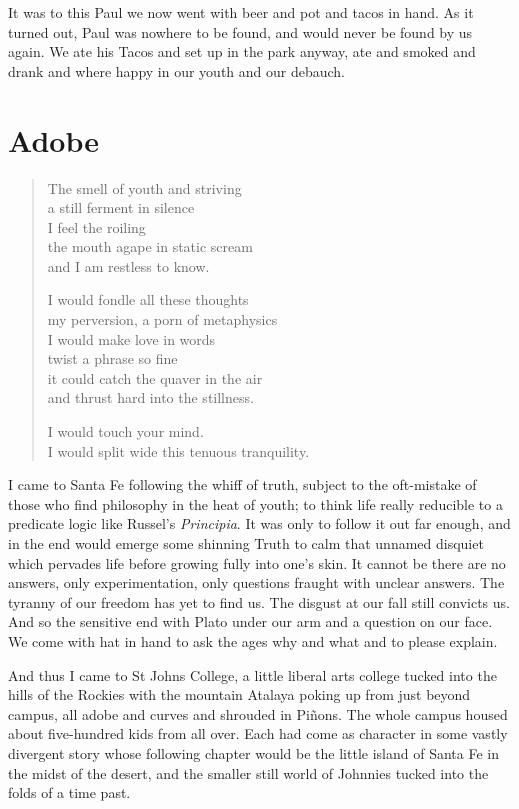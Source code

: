 \documentclass[ebook, 10pt, openright, onecolumn]{memoir}
\newenvironment{poetry}
{
  \begin{quote}
    \begin{itshape}
      \small
    }
    {
    \end{itshape}
  \end{quote}
}
\begin{document}
It was to this Paul we now went with beer and pot and tacos in hand.  As it
turned out, Paul was nowhere to be found, and would never be found by us again.
We ate his Tacos and set up in the park anyway, ate and smoked and drank and
where happy in our youth and our debauch.

\chapter{Adobe}
\label{cha:adobe}

\begin{poetry}
  The smell of youth and striving\\
  a still ferment in silence\\
  I feel the roiling\\
  the mouth agape in static scream\\
  and I am restless to know.

  
  I would fondle all these thoughts\\
  my perversion, a porn of metaphysics\\ 
  I would make love in words\\
  twist a phrase so fine\\
  it could catch the quaver in the air\\
  and thrust hard into the stillness.


  I would touch your mind.\\
  I would split wide this tenuous tranquility.\\
\end{poetry}

I came to Santa Fe following the whiff of truth, subject to the oft-mistake of
those who find philosophy in the heat of youth; to think life really reducible
to a predicate logic like Russel's \textit{Principia}. It was only to follow it
out far enough, and in the end would emerge some shinning Truth to calm that
unnamed disquiet which pervades life before growing fully into one's skin.  It
cannot be there are no answers, only experimentation, only questions fraught
with unclear answers.  The tyranny of our freedom has yet to find us.  The
disgust at our fall still convicts us.  And so the sensitive end with Plato
under our arm and a question on our face.  We come with hat in hand to ask the
ages why and what and to please explain.

And thus I came to St Johns College, a little liberal arts college tucked into
the hills of the Rockies with the mountain Atalaya poking up from just beyond
campus, all adobe and curves and shrouded in Piñons.  The whole campus housed
about five-hundred kids from all over.  Each had come as character in some
vastly divergent story whose following chapter would be the little island of
Santa Fe in the midst of the desert, and the smaller still world of Johnnies
tucked into the folds of a time past. 
\end{document}

